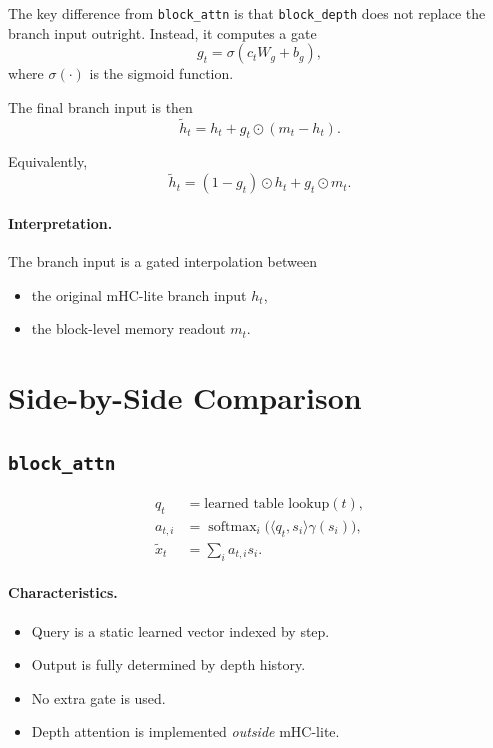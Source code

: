 \documentclass[11pt]{article}
\begin{document}
The key difference from \texttt{block\_attn} is that \texttt{block\_depth} does not replace the branch input outright.
Instead, it computes a gate
\begin{equation}
    g_t
    =
    \sigma(c_t W_g + b_g),
\end{equation}
where $\sigma(\cdot)$ is the sigmoid function.

The final branch input is then
\begin{equation}
    \tilde{h}_t
    =
    h_t + g_t \odot (m_t - h_t).
\end{equation}

Equivalently,
\begin{equation}
    \tilde{h}_t
    =
    (1 - g_t) \odot h_t + g_t \odot m_t.
\end{equation}

\paragraph{Interpretation.}
The branch input is a gated interpolation between
\begin{itemize}
    \item the original mHC-lite branch input $h_t$,
    \item the block-level memory readout $m_t$.
\end{itemize}

\section{Side-by-Side Comparison}

\subsection{\texttt{block\_attn}}

\begin{align}
    q_t &= \text{learned table lookup}(t), \\
    a_{t,i} &= \operatorname{softmax}_i\!\big(\langle q_t, s_i \rangle \gamma(s_i)\big), \\
    \tilde{x}_t &= \sum_i a_{t,i} s_i.
\end{align}

\paragraph{Characteristics.}
\begin{itemize}
    \item Query is a static learned vector indexed by step.
    \item Output is fully determined by depth history.
    \item No extra gate is used.
    \item Depth attention is implemented \emph{outside} mHC-lite.
\end{itemize}
\end{document}
